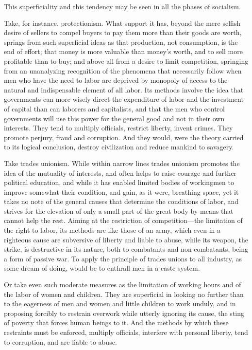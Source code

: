 \documentclass{book}
\begin{document}
This superficiality and this tendency may be seen in all the phases of socialism.

Take, for instance, protectionism. What support it has, beyond the mere selfish desire of sellers to compel buyers to pay them more than their goods are worth, springs from such superficial ideas as that production, not consumption, is the end of effort; that money is more valuable than money’s worth, and to sell more profitable than to buy; and above all from a desire to limit competition, springing from an unanalyzing recognition of the phenomena that necessarily follow when men who have the need to labor are deprived by monopoly of access to the natural and indispensable element of all labor. Its methods involve the idea that governments can more wisely direct the expenditure of labor and the investment of capital than can laborers and capitalists, and that the men who control governments will use this power for the general good and not in their own interests. They tend to multiply officials, restrict liberty, invent crimes. They promote perjury, fraud and corruption. And they would, were the theory carried to its logical conclusion, destroy civilization and reduce mankind to savagery.

Take trades unionism. While within narrow lines trades unionism promotes the idea of the mutuality of interests, and often helps to raise courage and further political education, and while it has enabled limited bodies of workingmen to improve somewhat their condition, and gain, as it were, breathing space, yet it takes no note of the general causes that determine the conditions of labor, and strives for the elevation of only a small part of the great body by means that cannot help the rest. Aiming at the restriction of competition—the limitation of the right to labor, its methods are like those of an army, which even in a righteous cause are subversive of liberty and liable to abuse, while its weapon, the strike, is destructive in its nature, both to combatants and non-combatants, being a form of passive war. To apply the principle of trades unions to all industry, as some dream of doing, would be to enthrall men in a caste system.

Or take even such moderate measures as the limitation of working hours and of the labor of women and children. They are superficial in looking no further than to the eagerness of men and women and little children to work unduly, and in proposing forcibly to restrain overwork while utterly ignoring its cause, the sting of poverty that forces human beings to it. And the methods by which these restraints must be enforced, multiply officials, interfere with personal liberty, tend to corruption, and are liable to abuse.
\end{document}
